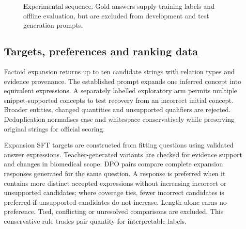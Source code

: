 \documentclass[12pt,a4paper]{article}
\begin{document}
\begin{figure}[htbp]
\centering
{}
\caption{Experimental sequence. Gold answers supply training labels and offline
evaluation, but are excluded from development and test generation prompts.}
\label{fig:workflow}
\end{figure}

\subsection{Targets, preferences and ranking data}

Factoid expansion returns up to ten candidate strings with relation types and evidence provenance. The established prompt expands one inferred concept into equivalent expressions. A separately labelled exploratory arm permits multiple snippet-supported concepts to test recovery from an incorrect initial concept. Broader entities, changed quantities and unsupported qualifiers are rejected. Deduplication normalises case and whitespace conservatively while preserving original strings for official scoring.

Expansion SFT targets are constructed from fitting questions using validated answer expressions. Teacher-generated variants are checked for evidence support and changes in biomedical scope. DPO pairs compare complete expansion responses generated for the same question. A response is preferred when it contains more distinct accepted expressions without increasing incorrect or unsupported candidates; where coverage ties, fewer incorrect candidates is preferred if unsupported candidates do not increase. Length alone earns no preference. Tied, conflicting or unresolved comparisons are excluded. This conservative rule trades pair quantity for interpretable labels.
\end{document}
